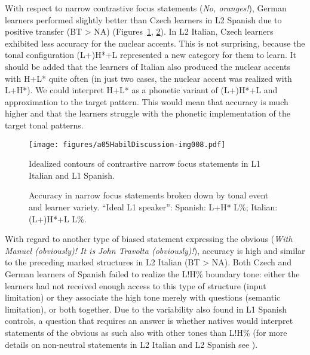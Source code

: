 With respect to narrow contrastive focus statements (\textit{No, oranges!}), German learners performed slightly better than Czech learners in L2 Spanish due to positive transfer (BT > NA) (Figures~\ref{fig:5.4}, \ref{fig:5.5}). In L2 Italian, Czech learners exhibited less accuracy for the nuclear accents. This is not surprising, because the tonal configuration (L+)H*+L represented a new category for them to learn. It should be added that the learners of Italian also produced the nuclear accents with H+L* quite often (in just two cases, the nuclear accent was realized with L+H*). We could interpret H+L* as a phonetic variant of (L+)H*+L and approximation to the target pattern. This would mean that accuracy is much higher and that the learners struggle with the phonetic implementation of the target tonal patterns.

\vfill
\begin{figure}[H]
\texttt{[image: figures/a05HabilDiscussion-img008.pdf]}
\caption{Idealized contours of contrastive narrow focus statements in L1 Italian and L1 Spanish.}
\label{fig:5.4}
\end{figure}
\vfill
\begin{figure}[H]
\caption{Accuracy in narrow focus statements broken down by tonal event and learner variety. ``Ideal L1 speaker'': Spanish: L+H* L\%; Italian: (L+)H*+L L\%.}
\label{fig:5.5}
\end{figure}
\vfill\pagebreak


With regard to another type of biased statement expressing the obvious (\textit{With Manuel (obviously)! It is John Travolta (obviously)!}), accuracy is high and similar to the preceding marked structures in L2 Italian (BT > NA). Both Czech and German learners of Spanish failed to realize the L!H\% boundary tone: either the learners had not received enough access to this type of structure (input limitation) or they associate the high tone merely with questions (semantic limitation), or both together. Due to the variability also found in L1 Spanish controls, a question that requires an answer is whether natives would interpret statements of the obvious as such also with other tones than L!H\% (for more details on non-neutral statements in L2 Italian and L2 Spanish see \citealt{Pešková2022b}).


